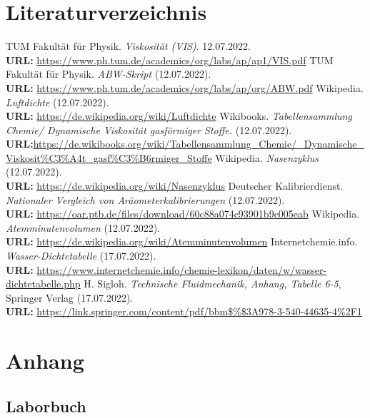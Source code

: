 \documentclass{article}
\begin{document}
\section{Literaturverzeichnis}
\begin{thebibliography}{9}
TUM Fakultät für Physik. \emph{Viskosität (VIS)}. 12.07.2022. \\
\textbf{URL:} \url{https://www.ph.tum.de/academics/org/labs/ap/ap1/VIS.pdf}
TUM Fakultät für Physik. \emph{ABW-Skript} (12.07.2022). \\
\textbf{URL:} \url{https://www.ph.tum.de/academics/org/labs/ap/org/ABW.pdf}
Wikipedia. \emph{Luftdichte} (12.07.2022). \\
\textbf{URL:} \url{https://de.wikipedia.org/wiki/Luftdichte}
Wikibooks. \emph{Tabellensammlung Chemie/ Dynamische Viskosität gasförmiger Stoffe.} (12.07.2022). \\
\textbf{URL:}\url{https://de.wikibooks.org/wiki/Tabellensammlung_Chemie/_Dynamische_Viskosit%C3%A4t_gasf%C3%B6rmiger_Stoffe}
Wikipedia. \emph{Nasenzyklus} (12.07.2022). \\
\textbf{URL:} \url{https://de.wikipedia.org/wiki/Nasenzyklus}
Deutscher Kalibrierdienst. \emph{Nationaler Vergleich von Aräometerkalibrierungen} (12.07.2022). \\
\textbf{URL:} \url{https://oar.ptb.de/files/download/60c88a074c93901b9c005eab}
Wikipedia. \emph{Atemminutenvolumen} (12.07.2022). \\
\textbf{URL:} \url{https://de.wikipedia.org/wiki/Atemminutenvolumen}
Internetchemie.info. \emph{Wasser-Dichtetabelle} (17.07.2022). \\
\textbf{URL:} \url{https://www.internetchemie.info/chemie-lexikon/daten/w/wasser-dichtetabelle.php}
H. Sigloh. \emph{Technische Fluidmechanik, Anhang, Tabelle 6-5}, Springer Verlag (17.07.2022). \\
\textbf{URL:} \url{https://link.springer.com/content/pdf/bbm$\%$3A978-3-540-44635-4%2F1}
\end{thebibliography}
\section{Anhang}
\subsection{Laborbuch}

\end{document}
